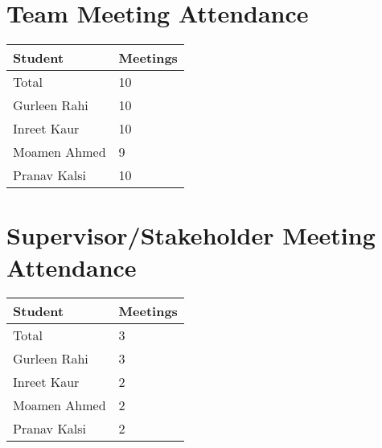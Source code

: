 \documentclass{article}
\begin{document}
\section{Team Meeting Attendance}


\begin{table}[H]
\centering
\begin{tabular}{ll}
\toprule
\textbf{Student} & \textbf{Meetings}\\
\midrule
Total & 10\\
Gurleen Rahi & 10 \\
Inreet Kaur & 10 \\
Moamen Ahmed & 9 \\
Pranav Kalsi & 10 \\
\bottomrule
\end{tabular}
\end{table}


\section{Supervisor/Stakeholder Meeting Attendance}


\begin{table}[H]
\centering
\begin{tabular}{ll}
\toprule
\textbf{Student} & \textbf{Meetings}\\
\midrule
Total &3 \\
Gurleen Rahi & 3\\
Inreet Kaur & 2\\
Moamen Ahmed & 2\\
Pranav Kalsi & 2\\
\bottomrule
\end{tabular}
\end{table}
\end{document}
